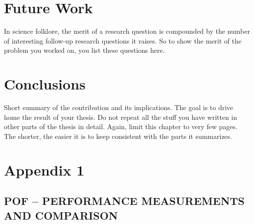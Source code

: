 \documentclass[12pt]{article}
\begin{document}
\section{Future Work}
\label{sec:6}

 In science folklore, the merit of a research question is compounded by the number of interesting follow-up research questions it raises. 
 So to show the merit of the problem you worked on, you list these questions here.
\pagebreak


\section{Conclusions}
\label{sec:7}
Short summary of the contribution and its implications. The goal is to drive home the result of your thesis.
Do not repeat all the stuff you have written in other parts of the thesis in detail. Again, limit this chapter to very few pages. 
The shorter, the easier it is to keep consistent with the parts it summarizes.

\pagebreak








\pagebreak


\appendix

\section{Appendix 1}

\label{Appendix 1}

\subsection*{POF -- PERFORMANCE MEASUREMENTS AND COMPARISON}
\end{document}
